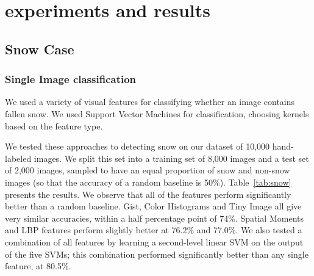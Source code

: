 \documentclass[10pt,journal,compsoc]{IEEEtran}
\begin{document}








\section{experiments and results}
\label{sec:experiments}



\subsection{Snow Case}

\subsubsection{Single Image classification}

We used a variety of  visual features  for classifying
whether an image contains fallen snow. We used Support Vector
Machines for classification, choosing kernels based on the feature
type. 

We tested these approaches to detecting snow on our dataset of
10,000 hand-labeled images. We split this set into a training set of
8,000 images and a test set of 2,000 images, sampled to have an
 equal proportion of snow and non-snow images (so
that the accuracy of a random baseline is 50\%).
Table~\ref{tab:snow} presents the results. We observe that all of the
features perform significantly better than a random baseline. 
Gist, Color Histograms and Tiny Image all give very similar accuracies, within a half
percentage point of 74\%. Spatial Moments and
LBP  features perform
slightly better at 76.2\% and 77.0\%. We also tested a combination of all 
features by learning a second-level linear SVM on the output of the
five SVMs; this combination performed significantly better than any single feature,
at 80.5\%.
\end{document}
